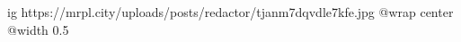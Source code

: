  
 
 
 
 

\ifcmt
  ig https://mrpl.city/uploads/posts/redactor/tjanm7dqvdle7kfe.jpg
  @wrap center
  @width 0.5
\fi
